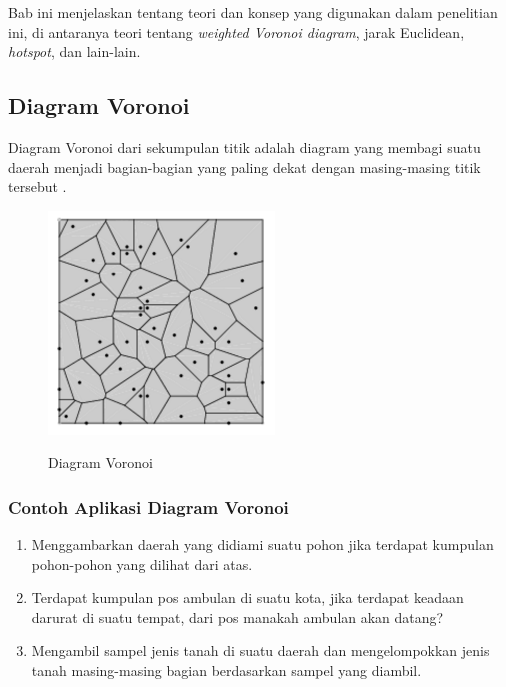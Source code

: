 \chapter{\babDua}
Bab ini menjelaskan tentang teori dan konsep yang digunakan dalam penelitian ini, di antaranya teori tentang \textit{weighted Voronoi diagram}, jarak Euclidean, \textit{hotspot}, dan lain-lain.

\section{Diagram Voronoi}\label{sec:diagramVoronoi}

Diagram Voronoi dari sekumpulan titik adalah diagram yang membagi suatu daerah menjadi bagian-bagian yang paling dekat dengan masing-masing titik tersebut \cite{geometric.algebra}.

\begin{figure}
	\centering
	\includegraphics[width=6cm]{pics/diagramVoronoi.png}
	\caption{Diagram Voronoi}
	\label{fig:diagramVoronoi}
	\cite{diagram.voronoi}
\end{figure} 

\subsection{Contoh Aplikasi Diagram Voronoi}
\begin{enumerate}
\item Menggambarkan daerah yang didiami suatu pohon jika terdapat kumpulan pohon-pohon yang dilihat dari atas. \cite{voronoi.wiki}

\item Terdapat kumpulan pos ambulan di suatu kota, jika terdapat keadaan darurat di suatu tempat, dari pos manakah ambulan akan datang? \cite{voronoi.wiki}

\item Mengambil sampel jenis tanah di suatu daerah dan mengelompokkan jenis tanah masing-masing bagian berdasarkan sampel yang diambil. \cite{voronoi.wiki}
\end{enumerate}

